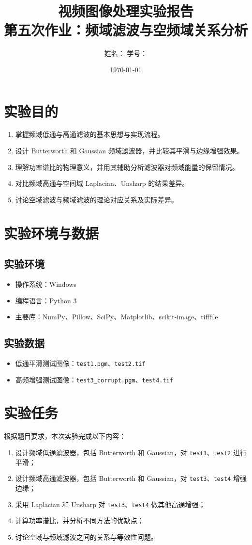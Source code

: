 \documentclass[UTF8,a4paper,12pt]{ctexart}
\title{视频图像处理实验报告\\第五次作业：频域滤波与空频域关系分析}
\author{姓名：\underline{\hspace{3cm}} \quad 学号：\underline{\hspace{3cm}}}
\date{\today}
\begin{document}
\maketitle
\tableofcontents
\newpage

\section{实验目的}
\begin{enumerate}
  \item 掌握频域低通与高通滤波的基本思想与实现流程。
  \item 设计 Butterworth 和 Gaussian 频域滤波器，并比较其平滑与边缘增强效果。
  \item 理解功率谱比的物理意义，并用其辅助分析滤波器对频域能量的保留情况。
  \item 对比频域高通与空间域 Laplacian、Unsharp 的结果差异。
  \item 讨论空域滤波与频域滤波的理论对应关系及实际差异。
\end{enumerate}

\section{实验环境与数据}
\subsection{实验环境}
\begin{itemize}
  \item 操作系统：Windows
  \item 编程语言：Python 3
  \item 主要库：NumPy、Pillow、SciPy、Matplotlib、scikit-image、tifffile
\end{itemize}

\subsection{实验数据}
\begin{itemize}
  \item 低通平滑测试图像：\texttt{test1.pgm}、\texttt{test2.tif}
  \item 高频增强测试图像：\texttt{test3\_corrupt.pgm}、\texttt{test4.tif}
\end{itemize}

\section{实验任务}
根据题目要求，本次实验完成以下内容：
\begin{enumerate}
  \item 设计频域低通滤波器，包括 Butterworth 和 Gaussian，对 \texttt{test1}、\texttt{test2} 进行平滑；
  \item 设计频域高通滤波器，包括 Butterworth 和 Gaussian，对 \texttt{test3}、\texttt{test4} 增强边缘；
  \item 采用 Laplacian 和 Unsharp 对 \texttt{test3}、\texttt{test4} 做其他高通增强；
  \item 计算功率谱比，并分析不同方法的优缺点；
  \item 讨论空域与频域滤波之间的关系与等效性问题。
\end{enumerate}
\end{document}
